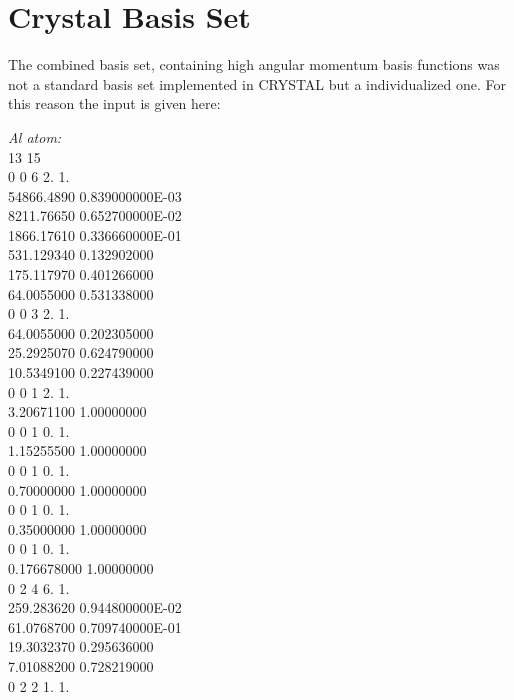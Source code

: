 \documentclass[11pt,DIV=13,BCOR=5mm,a4paper,headinclude]{scrbook}
\begin{document}
\def\thefigure{E.\arabic{figure}}
\def\thetable{E.\arabic{table}}
\section{Crystal Basis Set}
The combined basis set, containing high angular momentum basis functions was not a standard basis set implemented in CRYSTAL but a individualized one. For this reason the input is given here:
\\
\begin{spacing}{0.5}
{\tiny \textit{Al atom:}\\
13 15\\
0 0 6 2. 1.\\
       54866.4890         0.839000000E-03\\
       8211.76650         0.652700000E-02\\
       1866.17610         0.336660000E-01\\
       531.129340         0.132902000\\
       175.117970         0.401266000\\
       64.0055000         0.531338000\\
0 0 3 2. 1.\\
       64.0055000         0.202305000\\
       25.2925070         0.624790000\\
       10.5349100         0.227439000\\
0 0 1 2. 1.\\
       3.20671100          1.00000000\\
0 0 1 0. 1.\\
       1.15255500          1.00000000\\
0 0 1 0. 1.\\
       0.70000000          1.00000000\\
0 0 1 0. 1.\\
       0.35000000          1.00000000\\
0 0 1 0. 1.\\
      0.176678000          1.00000000\\
0 2 4 6. 1.\\
       259.283620         0.944800000E-02\\
       61.0768700         0.709740000E-01\\
       19.3032370         0.295636000\\
       7.01088200         0.728219000\\
0 2 2 1. 1.\\
}
\end{spacing}
\end{document}
